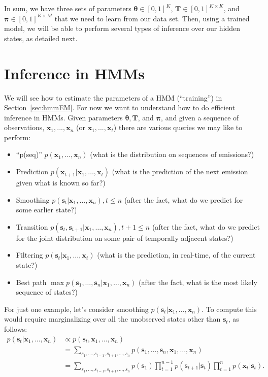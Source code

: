 In sum, we have three sets of parameters $\boldsymbol{\theta} \in [0,1]^{K}$, $\textbf{T} \in [0,1]^{K \times K}$, and $\boldsymbol{\pi} \in [0,1]^{K \times M}$ that we need to learn from our data set.
Then, using a trained model, we will be able to perform several types of inference over our hidden states, as detailed next.

\section{Inference in HMMs}


We will see how to estimate the parameters of a HMM (``training'') in Section~\ref{sec:hmmEM}. For now we want to understand how to do efficient inference in HMMs. Given parameters $\boldsymbol{\theta}, \textbf{T}$, and $\boldsymbol{\pi}$, and given a sequence of observations, $\textbf{x}_1, ..., \textbf{x}_n$ (or $\textbf{x}_1, ..., \textbf{x}_t$) there are various queries we may like to perform:
%
\begin{itemize}
	\item ``p(seq)'' $p(\mathbf{x}_1,\ldots,\mathbf{x}_n)$  (what is the distribution on sequences of emissions?)
	\item Prediction $p(\mathbf{x}_{t+1}|\mathbf{x}_1,\ldots,\mathbf{x}_t)$ (what is the prediction of the next emission given what is known so far?)
	\item Smoothing $p(\mathbf{s}_t|\mathbf{x}_1,\ldots,\mathbf{x}_n), t\leq n$ (after the fact, what do we predict for some earlier state?)
	\item Transition $p(\mathbf{s}_t,\mathbf{s}_{t+1}|\mathbf{x}_1,\ldots,\mathbf{x}_n), t+1\leq n$ (after the fact, what do we predict for the joint distribution on some pair of temporally adjacent states?)
        \item Filtering $p(\mathbf{s}_t|\mathbf{x}_1,\ldots,\mathbf{x}_t)$ (what is the prediction, in real-time, of the current state?)
          \item Best path $\max p(\mathbf{s}_1,\ldots,\mathbf{s}_n|\mathbf{x}_1,\ldots,\mathbf{x}_n)$ (after the fact, what is the most likely sequence of states?)
\end{itemize}

For just one example, let's consider smoothing $p(\textbf{s}_t | \textbf{x}_1, ..., \textbf{x}_n)$. To
compute this 
would require marginalizing over all the unobserved states other than $\textbf{s}_{t}$, as follows:
\begin{align*}
  p(\textbf{s}_t |\textbf{x}_1, ..., \textbf{x}_n) &\propto p(\textbf{s}_t, \textbf{x}_1, ..., \textbf{x}_n)\\
                                                   &=\sum_{s_1,\ldots,s_{t-1},s_{t+1},\ldots,s_n} p(\textbf{s}_1, \ldots, \textbf{s}_n, \textbf{x}_1, \ldots, \textbf{x}_n)
  \\
                                                   &=\sum_{s_1,\ldots,s_{t-1},s_{t+1},\ldots,s_n}p(\textbf{s}_1) \prod_{t=1}^{n-1} p(\textbf{s}_{t+1} | \textbf{s}_t) \prod_{t=1}^{n} p(\textbf{x}_t | \textbf{s}_t).
\end{align*}

